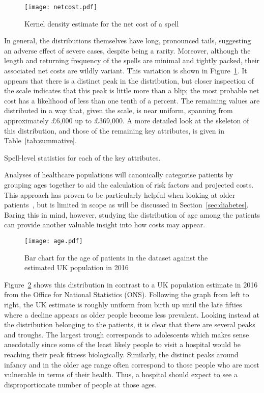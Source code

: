 \begin{figure}[htbp]
    \centering
    \texttt{[image: netcost.pdf]}
    \caption{Kernel density estimate for the net cost of a spell}%
    \label{fig:netcost}
\end{figure}

In general, the distributions themselves have long, pronounced tails, suggesting
an adverse effect of severe cases, despite being a rarity. Moreover, although
the length and returning frequency of the spells are minimal and tightly packed,
their associated net costs are wildly variant. This variation is shown in
Figure~\ref{fig:netcost}. It appears that there is a distinct peak in the
distribution, but closer inspection of the scale indicates that this peak is
little more than a blip; the most probable net cost has a likelihood of less
than one tenth of a percent. The remaining values are distributed in a way that,
given the scale, is near uniform, spanning from approximately \pounds6,000 up to
\pounds369,000. A more detailed look at the skeleton of this distribution, and
those of the remaining key attributes, is given in Table~\ref{tab:summative}.

\begin{table}[htbp]
    \centering
    \resizebox{\textwidth}{!}{%
        
    }
    \caption{Spell-level statistics for each of the key attributes.}%
    \label{tab:summative}
\end{table}

Analyses of healthcare populations will canonically categorise patients by
grouping ages together to aid the calculation of risk factors and projected
costs. This approach has proven to be particularly helpful when looking at older
patients~\cite{Billings327}, but is limited in scope as will be discussed in
Section~\ref{sec:diabetes}. Baring this in mind, however, studying the
distribution of age among the patients can provide another valuable insight into
how costs may appear.

\begin{figure}[htbp]
    \centering
    \texttt{[image: age.pdf]}
    \caption{Bar chart for the age of patients in the dataset against the
        estimated UK population in 2016}%
    \label{fig:age}
\end{figure}

Figure~\ref{fig:age} shows this distribution in contrast to a UK population
estimate in 2016 from the Office for National Statistics (ONS). Following the
graph from left to right, the UK estimate is roughly uniform from birth up until
the late fifties where a decline appears as older people become less prevalent.
Looking instead at the distribution belonging to the patients, it is clear that
there are several peaks and troughs. The largest trough corresponds to
adolescents which makes sense anecdotally since some of the least likely people
to visit a hospital would be reaching their peak fitness biologically.
Similarly, the distinct peaks around infancy and in the older age range
often correspond to those people who are most vulnerable in terms of their
health. Thus, a hospital should expect to see a disproportionate number of
people at those ages.

